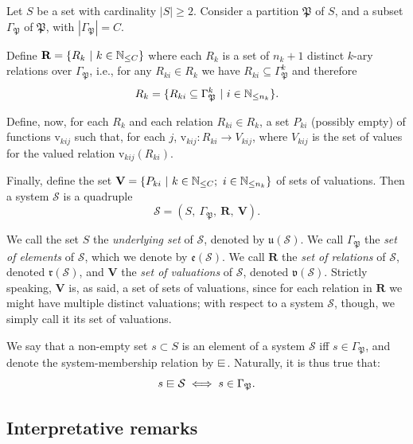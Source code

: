 \begin{definition}[System] \label{def::system}
Let $S$ be a set with cardinality $|S| \geq 2$. Consider a partition $\mathfrak{P}$ of $S$, and a subset $\Gamma_{\mathfrak{P}}$ of $\mathfrak{P}$, with $|\Gamma_{\mathfrak{P}}| = C$. 

Define $\mathbf{R} = \{R_k \ | \ k \in \mathbb{N}_{\leq C} \}$ where each $R_k$ is a set of $n_k+1$ distinct $k$-ary relations over $\Gamma_{\mathfrak{P}}$, i.e., for any $R_{ki} \in R_k$ we have $R_{ki} \subseteq \Gamma_{\mathfrak{P}}^k$ and therefore 
\[R_k = \{R_{ki} \subseteq \Gamma_{\mathfrak{P}}^k\ | \ i \in \mathbb{N}_{\leq n_k}\}.\]

Define, now, for each $R_k$ and each relation $R_{ki} \in R_k$, a set $P_{ki}$ (possibly empty) of functions $\mathrm{v}_{kij}$ such that, for each $j$, $\mathrm{v}_{kij}: R_{ki} \rightarrow V_{kij}$, where $V_{kij}$ is the set of values for the valued relation $\mathrm{v}_{kij}(R_{ki})$. 

Finally, define the set $\mathbf{V} = \{P_{ki} \ | \ k \in \mathbb{N}_{\leq C};\ i \in \mathbb{N}_{\leq n_k} \}$ of sets of valuations. Then a system $\mathcal{S}$ is a quadruple
\[ \mathcal{S} = (S,\ \Gamma_{\mathfrak{P}}, \ \mathbf{R},\ \mathbf{V}).\]

We call the set $S$ the \textit{underlying set} of $\mathcal{S}$, denoted by $\mathfrak{u}(\mathcal{S})$. We call $\Gamma_{\mathfrak{P}}$ the \textit{set of elements} of $\mathcal{S}$, which we denote by $\mathfrak{e}(\mathcal{S})$. We call $\mathbf{R}$ the \textit{set of relations} of $\mathcal{S}$, denoted $\mathfrak{r}(\mathcal{S})$, and $\mathbf{V}$ the \textit{set of valuations} of $\mathcal{S}$, denoted $\mathfrak{v}(\mathcal{S})$. Strictly speaking, $\mathbf{V}$ is, as said, a set of sets of valuations, since for each relation in $\mathbf{R}$ we might have multiple distinct valuations; with respect to a system $\mathcal{S}$, though, we simply call it its set of valuations. 

We say that a non-empty set $s \subset S$ is an element of a system $\mathcal{S}$ iff $s \in \Gamma_{\mathfrak{P}}$, and denote the system-membership relation by $\sqin$. Naturally, it is thus true that: 
\[s \sqin \mathcal{S} \iff s \in \Gamma_{\mathfrak{P}}.\]
\end{definition}

\subsection{Interpretative remarks}


